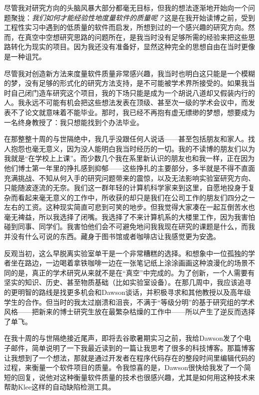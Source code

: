 \documentclass[12pt,UTF8,nofonts]{book}
\begin{document}
尽管我对研究方向的头脑风暴大部分都毫无目标，但我的想法逐渐地开始向一个问题聚拢：\emph{我们如何才能经验性地度量软件的质量呢？}这是在我开始读博之前，受到工程性实习中遇到的低质量的软件而启发，所想到过的一个感兴趣的研究方向。然而，在真空中空想研究思路的问题所在，是我当时没有足够所需的经验来把这些思路转化为现实的项目。因为我还没有准备好，显然这种完全的思想自由在当时更像是一种诅咒。

尽管我对创造新方法来度量软件质量非常感兴趣，我当时也明白这只能是一个模糊的梦，没有足够的形式化的研究方法支持，是不可能被学术界所接受的。如果我当时自己闭门造车研究这个项目，我的下场只能是成为一个胡说八道却又假装内行的人。我永远不可能有机会把这些想法发表在顶级、甚至次一级的学术会议中，而发表不了论文就意味着不能毕业。那时，我已经不再抱有虚无缥缈的梦想，想要成为一名终身教授了：我只想能找到个办法毕业。

在那整整十周的与世隔绝中，我几乎没跟任何人说话——甚至包括朋友和家人。找人抱怨也毫无意义，因为没人能明白我当时经历的一切。我的不读博的朋友们以为我就是“在学校上上课”。而少数几个我在系里新认识的朋友也和我一样，正在因为他们博士第一年里的挣扎感到抑郁——这些挣扎的主要部分，多半就是不得不直面充满挑战、不知从何入手的研究问题带来的震惊，以及无法影响实验室研究方向、只能随波逐流的无奈。我们这一群年轻的计算机科学家来到这里，自愿地投身于复杂而看起来毫无意义的工作中，所收获的却只是我们在公司工作的朋友们四分之一左右的工资。这种现实简直可悲到可笑的地步。但我觉得大家凑在一起互倒苦水也毫无裨益，所以我选择了闭嘴。我选择了不来计算机系的大楼里工作，因为我害怕碰到同事、同学们。我害怕他们会不可避免地问我我现在研究的课题是什么，而我并没有什么可说的东西。藏身于图书馆或者咖啡店让我感觉更为安逸。

反观当初，这么早脱离实验室单干是一个非常糟糕的选择。和想象中一位孤独的学者坐在路边，一边喝着拿铁咖啡一边在一张笔记纸上涂涂画画这种浪漫化的场景不同的是，真正的学术研究从来就不是在“真空”中完成的。为了创新，一个人需要有坚实的知识、历史、甚至物质基础（比如实验室设备）。在那几周中，我应该追寻的更明智的路线是找更多机会和Dawson谈话，并积极寻求和其他教授以及高年级学生的合作。但当时的我太过崩溃和沮丧，不满于“等级分明”的基于研究组的学术风格——把新来的博士研究生放在最繁杂枯燥的工作中——所以产生了逆反而选择了单飞。

\breakline

在我十周的与世隔绝接近尾声，即将去谷歌暑期实习之前，我给Dawson发了个电子邮件，简单说明了一下我最近读到的一篇让我思考了很多的科技博客。那篇博客让我想到了一个想法，那就是通过开发者在程序代码存在的整段时间里编辑代码的过程，来衡量一个软件项目的质量。令我惊喜的是，Dawson很快给我发了一个简短的回复，说他对这种衡量软件质量的技术也很感兴趣，尤其是如何用这种技术来帮助Klee这样的自动缺陷检测工具。
\end{document}
